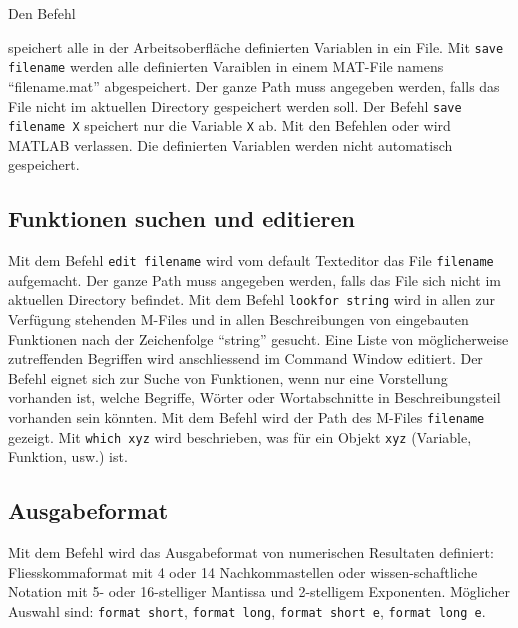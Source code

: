 Den Befehl { speichert alle in der Arbeitsoberfläche definierten Variablen in ein File. Mit {\color{red}\texttt{save filename}} werden alle definierten Varaiblen in einem MAT-File namens ``filename.mat'' abgespeichert. Der ganze Path muss angegeben werden, falls das File nicht im aktuellen Directory gespeichert werden soll. Der Befehl {\color{red}\texttt{save filename X}} speichert nur die Variable \texttt{X} ab.
\newline\newline
Mit den Befehlen  oder  wird MATLAB verlassen. Die definierten Variablen werden nicht automatisch gespeichert.
\subsection{Funktionen suchen und editieren}
Mit dem Befehl {\color{red}\texttt{edit filename}} wird vom default Texteditor das File \texttt{filename} aufgemacht. Der ganze Path muss angegeben werden, falls das File sich nicht im aktuellen Directory befindet. Mit dem Befehl {\color{red}\texttt{lookfor string}} wird in allen zur Verfügung stehenden M-Files und in allen Beschreibungen von eingebauten Funktionen nach der Zeichenfolge ``string'' gesucht. Eine Liste von möglicherweise zutreffenden Begriffen wird anschliessend im Command Window editiert. Der Befehl  eignet sich zur Suche von Funktionen, wenn nur eine Vorstellung vorhanden ist, welche Begriffe, Wörter oder Wortabschnitte in Beschreibungsteil vorhanden sein könnten.
\newline\newline
Mit dem Befehl  wird der Path des M-Files \texttt{filename} gezeigt. Mit {\color{red}\texttt{which xyz}} wird beschrieben, was für ein Objekt \texttt{xyz} (Variable, Funktion, usw.) ist.
\subsection{Ausgabeformat}
Mit dem Befehl  wird das Ausgabeformat von numerischen Resultaten definiert: Fliesskommaformat mit 4 oder 14 Nachkommastellen oder wissen-schaftliche Notation mit 5- oder 16-stelliger Mantissa und 2-stelligem Exponenten. Möglicher Auswahl sind: {\color{red}\texttt{format short}}, {\color{red}\texttt{format long}}, {\color{red}\texttt{format short e}}, {\color{red}\texttt{format long e}}.
}
